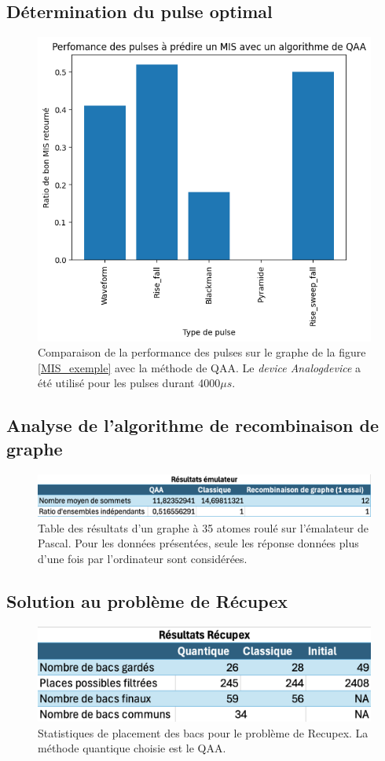 \documentclass[11pt]{article}
\begin{document}
\subsection{Détermination du pulse optimal}
\begin{figure}[H]
    \centering
    \includegraphics[width=0.49\linewidth]{images/pusle_comp.png}
    \caption{Comparaison de la performance des pulses sur le graphe de la figure \ref{MIS_exemple} avec la méthode de QAA. Le \textit{device Analogdevice} a été utilisé pour les pulses durant 4000$\mu s$.}
    \label{pulse_comp}
\end{figure}

\subsection{Analyse de l'algorithme de recombinaison de graphe}
\begin{figure}[H]
    \centering
    \includegraphics[width=0.70\linewidth]{images/table_emul.png}
    \caption{Table des résultats d'un graphe à 35 atomes roulé sur l'émalateur de Pascal. Pour les données présentées, seule les réponse données plus d'une fois par l'ordinateur sont considérées.}
    \label{emul_stats}
\end{figure}

\subsection{Solution au problème de Récupex}
\begin{figure}[H]
    \centering
    \includegraphics[width=0.49\linewidth]{images/recupex_solver.png}
    \caption{Statistiques de placement des bacs pour le problème de Recupex. La méthode quantique choisie est le QAA.}
    \label{recupex_stats}
\end{figure}
\end{document}
